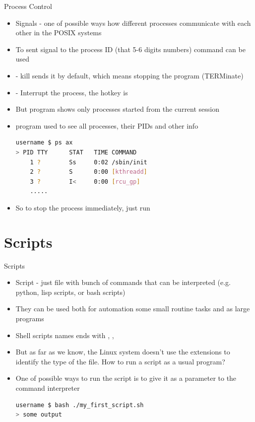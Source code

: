 \documentclass[usenames,dvipsnames,10pt,aspectratio=169]{beamer}
\begin{document}
\begin{frame}[fragile]{Process Control}
    \begin{itemize}
        \item Signals - one of possible ways how different processes communicate with each other in the POSIX systems
        \item To sent signal to the process ID (that 5-6 digits numbers)  command can be used
        \item {} - kill sends it by default, which means stopping the program (TERMinate)
        \item {} - Interrupt the process, the hotkey is 
        \item But  program shows only processes started from the current session
        \item {} program used to see all processes, their PIDs and other info
        \begin{lstlisting}[language=bash, style=shellstyle]
username $ ps ax
> PID TTY      STAT   TIME COMMAND
    1 ?        Ss     0:02 /sbin/init     
    2 ?        S      0:00 [kthreadd]
    3 ?        I<     0:00 [rcu_gp]
    .....\end{lstlisting}
        \item So to stop the process immediately, just run 
    \end{itemize}
    
\end{frame}

\section{Scripts}

\begin{frame}[fragile]{Scripts}
    \begin{itemize}
        \item Script - just file with bunch of commands that can be interpreted (e.g. python, lisp scripts, or bash scripts)
        \item They can be used both for automation some small routine tasks and as large programs
        \item Shell scripts names ends with , , 
        \item But as far as we know, the Linux system doesn't use the extensions to identify the type of the file. How to run a script as a usual program?
        \item One of possible ways to run the script is to give it as a parameter to the command interpreter
        \begin{lstlisting}[language=bash, style=shellstyle]
username $ bash ./my_first_script.sh
> some output
        \end{lstlisting}
    \end{itemize}
\end{frame}
\end{document}
